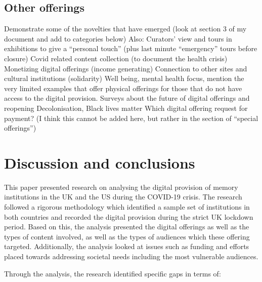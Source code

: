 \documentclass{egpubl}
\begin{document}





\subsection{Other offerings }
\label{int}

Demonstrate some of the novelties that have emerged (look at section 3 of my document and add to categories below)
Also: 
Curators’ view and tours in exhibitions to give a “personal touch” (plus last minute “emergency” tours before closure)
Covid related content collection (to document the health crisis)
Monetizing digital offerings (income generating)
Connection to other sites and cultural institutions (solidarity)
Well being, mental health focus, mention the very limited examples that offer physical offerings for those  that do not have access to the digital provision.
Surveys about the future of digital offerings and reopening
Decolonisation, Black lives matter
Which digital offering request for payment? (I think this cannot be added here, but rather in the section of “special offerings”)

\section{Discussion and conclusions}
\label{disc}
This paper presented research on analysing the digital provision of memory institutions in the UK and the US during the COVID-19 crisis. The research followed a rigorous methodology which identified a sample set of institutions in both countries and recorded the digital provision during the strict UK lockdown period. Based on this, the analysis presented the digital offerings as well as the types of content involved, as well as the types of audiences which these offering targeted. Additionally, the analysis looked at issues such as funding and efforts placed towards addressing societal needs including the most vulnerable audiences.

Through the analysis, the research identified specific gaps in terms of:
\end{document}

